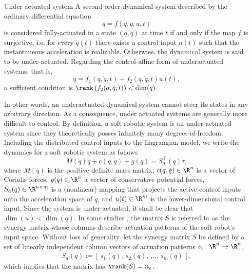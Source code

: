 \begin{define}{Under-actuated system}
A second-order dynamical system described by the ordinary differential equation
%
\begin{equation}
\ddot{q} = f(q,\dot{q},u,t)
\end{equation}
%
is considered fully-actuated in a state $(q,\dot{q})$ at time $t$ if and only if the map $f$ is surjective, i.e, for every $\ddot{q}(t)$ there exists a control input $u(t)$ such that the instantaneous acceleration is realizable. Otherwise, the dynamical system is said to be under-actuated. Regarding the control-affine form of underactuated systems, that is,
%
\begin{equation}
\ddot{q} = f_1(q,\dot{q},t) + f_2(q,\dot{q},t)u(t),
\end{equation}
%
a sufficient condition is $\rank \left(f_2(q,\dot{q},t)\right) < \dim(q)$.
\end{define}

\noindent In other words, an underactuated dynamical system cannot steer its states in any arbitrary direction. As a consequence, under actuated systems are generally more difficult to control. By definition, a soft robotic system is an under-actuated system since they theoretically posses infinitely many degrees-of-freedom. Including the distributed control inputs to the Lagrangian model, we write the dynamics for a soft robotic system as follows
%
\begin{equation}
M(q)\ddot{q} + c(q,\dot{q}) + g(q)= S_a^\top(q) \tau,
\label{eq:under_actuated_ode}
\end{equation}
%
\noindent where $M(q)$ is the positive definite mass matrix, $c(q,\dot{q})\in \R^{n}$ is a vector of Coriolis forces, $g(q)\in \R^{n}$ a vector of conservative potential forces, $S_a(q) \in \R^{n\times m}$ is a (nonlinear) mapping that projects the active control inputs onto the acceleration space of ${q}$, and $u(t) \in \R^{m}$ is the lower-dimensional control input. Since the system is under-actuated, it shall be clear that $\dim(u) < \dim(q)$. In some studies \cite{Santina2019}, the matrix $S$ is referred to as the synergy matrix whose columns describe actuation patterns of the soft robot's input space. Without loss of generality, let the synergy matrix $S$ be defined by a set of linearly independent column vectors of actuation patterns $s_i: \R^n \to \R^n$,
%
\begin{align}
S_a(q) := \left[\,s_1(q),\,s_2(q),\,...,\,s_m(q)\,\right], 
\end{align}
%
which implies that the matrix has $\rank(S) = n_a$.

